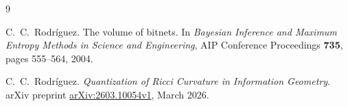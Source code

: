 \documentclass[11pt]{article}
\theoremstyle{plain}
\theoremstyle{definition}
\theoremstyle{remark}
\begin{document}
\begin{thebibliography}{9}

C.~C.~Rodr\'iguez.
The volume of bitnets.
In \emph{Bayesian Inference and Maximum Entropy Methods in Science and Engineering},
AIP Conference Proceedings \textbf{735}, pages 555--564, 2004.

C.~C.~Rodr\'iguez.
\emph{Quantization of Ricci Curvature in Information Geometry}.
arXiv preprint \href{https://arxiv.org/abs/2603.10054v1}{arXiv:2603.10054v1}, March 2026.

\end{thebibliography}
\end{document}
